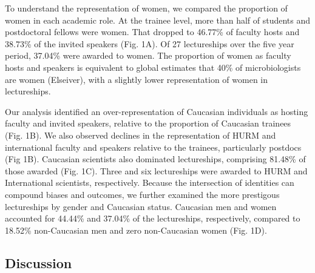 \documentclass[10pt,]{article}
\begin{document}
To understand the representation of women, we compared the proportion of
women in each academic role. At the trainee level, more than half of
students and postdoctoral fellows were women. That dropped to 46.77\% of
faculty hosts and 38.73\% of the invited speakers (Fig. 1A). Of 27
lectureships over the five year period, 37.04\% were awarded to women.
The proportion of women as faculty hosts and speakers is equivalent to
global estimates that 40\% of microbiologists are women (Elseiver), with
a slightly lower representation of women in lectureships.

Our analysis identified an over-representation of Caucasian individuals
as hosting faculty and invited speakers, relative to the proportion of
Caucasian trainees (Fig. 1B). We also observed declines in the
representation of HURM and international faculty and speakers relative
to the trainees, particularly postdocs (Fig 1B). Caucasian scientists
also dominated lectureships, comprising 81.48\% of those awarded (Fig.
1C). Three and six lectureships were awarded to HURM and International
scientists, respectively. Because the intersection of identities can
compound biases and outcomes, we further examined the more prestigous
lectureships by gender and Caucasian status. Caucasian men and women
accounted for 44.44\% and 37.04\% of the lectureships, respectively,
compared to 18.52\% non-Caucasian men and zero non-Caucasian women (Fig.
1D).

\subsection{Discussion}\label{discussion}
\end{document}
